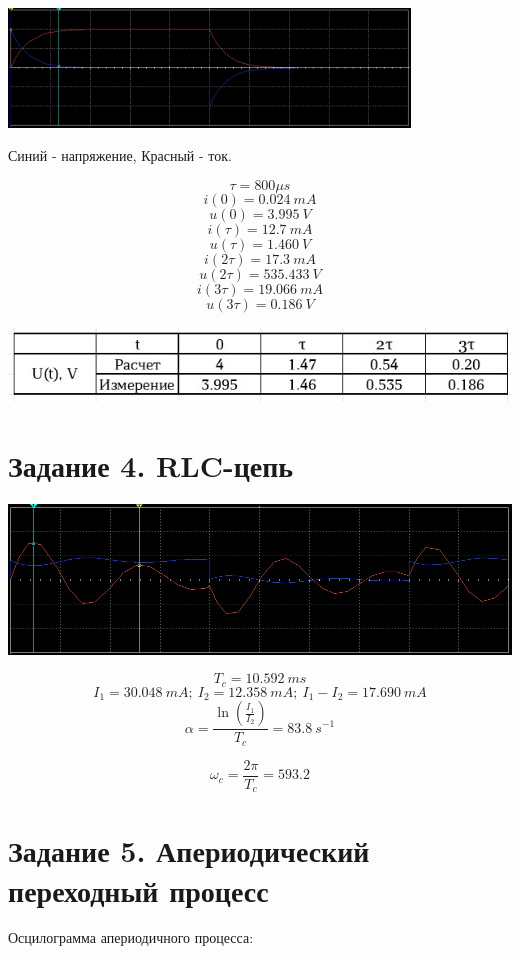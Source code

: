 \documentclass[14pt, a4paper]{article}
\begin{document}
        {
            \includegraphics[width=0.8\textwidth]{OSC_RL.jpg}
        }

        Синий - напряжение, Красный - ток.

        $$\tau = 800 \mu s$$
        $$i(0) = 0.024 \ mA$$
        $$u(0) = 3.995 \ V$$
        $$i(\tau) = 12.7 \ mA$$
        $$u(\tau) = 1.460 \ V$$
        $$i(2\tau) = 17.3 \ mA$$
        $$u(2\tau) = 535.433 \ V$$
        $$i(3\tau) = 19.066 \ mA$$
        $$u(3\tau) = 0.186 \ V$$

        {\includegraphics{table3.jpg}}

    
    \section*{Задание 4. RLC-цепь}

    {\includegraphics[width=1.2\textwidth]{OSC_RLС.jpg}}

    $$T_c = 10.592 \ ms$$
    $$I_1 = 30.048 \ mA; \ I_2 = 12.358 \ mA; \ I_1 - I_2 = 17.690 \ mA $$
    $$\alpha = \frac{\ln(\frac{I_1}{I_2})}{T_c} = 83.8 \ s^{-1}$$

    $$\omega_c = \frac{2\pi}{T_c} = 593.2$$




    \section*{Задание 5. Апериодический переходный процесс}
        Осцилограмма апериодичного процесса:
\end{document}

